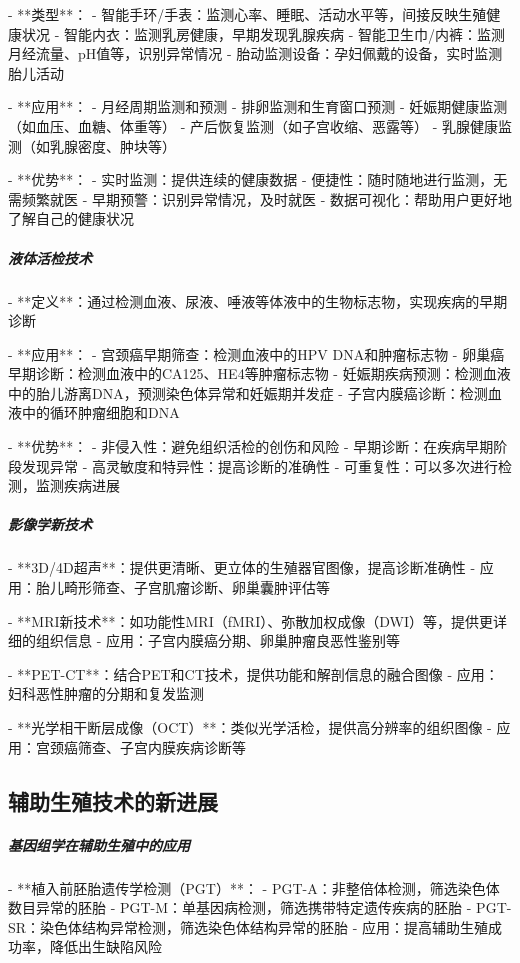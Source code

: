 \begin{enumerate}
- **类型**：
  - 智能手环/手表：监测心率、睡眠、活动水平等，间接反映生殖健康状况
  - 智能内衣：监测乳房健康，早期发现乳腺疾病
  - 智能卫生巾/内裤：监测月经流量、pH值等，识别异常情况
  - 胎动监测设备：孕妇佩戴的设备，实时监测胎儿活动

- **应用**：
  - 月经周期监测和预测
  - 排卵监测和生育窗口预测
  - 妊娠期健康监测（如血压、血糖、体重等）
  - 产后恢复监测（如子宫收缩、恶露等）
  - 乳腺健康监测（如乳腺密度、肿块等）

- **优势**：
  - 实时监测：提供连续的健康数据
  - 便捷性：随时随地进行监测，无需频繁就医
  - 早期预警：识别异常情况，及时就医
  - 数据可视化：帮助用户更好地了解自己的健康状况

\subparagraph{液体活检技术}

- **定义**：通过检测血液、尿液、唾液等体液中的生物标志物，实现疾病的早期诊断

- **应用**：
  - 宫颈癌早期筛查：检测血液中的HPV DNA和肿瘤标志物
  - 卵巢癌早期诊断：检测血液中的CA125、HE4等肿瘤标志物
  - 妊娠期疾病预测：检测血液中的胎儿游离DNA，预测染色体异常和妊娠期并发症
  - 子宫内膜癌诊断：检测血液中的循环肿瘤细胞和DNA

- **优势**：
  - 非侵入性：避免组织活检的创伤和风险
  - 早期诊断：在疾病早期阶段发现异常
  - 高灵敏度和特异性：提高诊断的准确性
  - 可重复性：可以多次进行检测，监测疾病进展

\subparagraph{影像学新技术}

- **3D/4D超声**：提供更清晰、更立体的生殖器官图像，提高诊断准确性
  - 应用：胎儿畸形筛查、子宫肌瘤诊断、卵巢囊肿评估等

- **MRI新技术**：如功能性MRI（fMRI）、弥散加权成像（DWI）等，提供更详细的组织信息
  - 应用：子宫内膜癌分期、卵巢肿瘤良恶性鉴别等

- **PET-CT**：结合PET和CT技术，提供功能和解剖信息的融合图像
  - 应用：妇科恶性肿瘤的分期和复发监测

- **光学相干断层成像（OCT）**：类似光学活检，提供高分辨率的组织图像
  - 应用：宫颈癌筛查、子宫内膜疾病诊断等

\subsection{辅助生殖技术的新进展}

\subparagraph{基因组学在辅助生殖中的应用}

- **植入前胚胎遗传学检测（PGT）**：
  - PGT-A：非整倍体检测，筛选染色体数目异常的胚胎
  - PGT-M：单基因病检测，筛选携带特定遗传疾病的胚胎
  - PGT-SR：染色体结构异常检测，筛选染色体结构异常的胚胎
  - 应用：提高辅助生殖成功率，降低出生缺陷风险


\end{enumerate}
